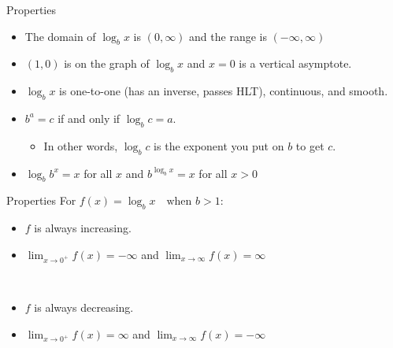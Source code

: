 \documentclass[t,usenames,dvipsnames]{beamer}
\begin{document}
\begin{frame}{Properties}
\begin{itemize}
    \item<+->The domain of $\log_b x$ is $(0, \infty)$ and the range is $(-\infty, \infty)$    \newline\\
    \item<+->$(1,0)$ is on the graph of $\log_b x$ and $x=0$ is a vertical asymptote.   \newline\\
    \item<+->$\log_b x$ is one-to-one (has an inverse, passes HLT), continuous, and smooth. \newline\\
    \item<+->$b^a = c$ if and only if $\log_b c = a$.   \newline\\
        \begin{itemize}
            \item<+->In other words, $\log_b c$ is the \alert{exponent} you put on $b$ to get $c$. \newline\\
        \end{itemize}
    \item<+->$\log_b b^x = x$ for all $x$ and $b^{\log_b x} = x$ for all $x >0$
\end{itemize}
\end{frame}

\begin{frame}{Properties}
For $f(x) = \log_b x \quad \text{when } b > 1$:    \newline\\
\begin{itemize}
    \item<2->$f$ is always increasing.  \newline\\
    \item<3->$\lim_{x \to 0^+} f(x) = -\infty$ and $\lim_{x \to \infty} f(x) = \infty$  \newline\\
\end{itemize}

 \newline\\
\begin{itemize}
    \item<5->$f$ is always decreasing. \newline\\
    \item<6->$\lim_{x \to 0^+} f(x) = \infty$ and $\lim_{x \to \infty} f(x) = -\infty$ 
\end{itemize}
\end{frame}
\end{document}
